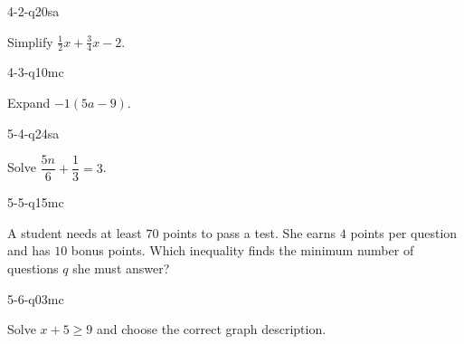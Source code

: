 \begin{practiceQuestion}{4-2-q20}{sa}
\begin{questionText}
Simplify $\frac{1}{2}x + \frac{3}{4}x - 2$.


\begin{center}
\hspace{1cm}
\end{center}
\end{questionText}
\end{practiceQuestion}

\begin{practiceQuestion}{4-3-q10}{mc}
\begin{questionText}
Expand $-1(5a - 9)$.
\end{questionText}
\end{practiceQuestion}

\begin{practiceQuestion}{5-4-q24}{sa}
\begin{questionText}
Solve $\dfrac{5n}{6} + \dfrac{1}{3} = 3$.
\end{questionText}
\end{practiceQuestion}

\begin{practiceQuestion}{5-5-q15}{mc}
\begin{questionText}
A student needs at least $70$ points to pass a test. She earns $4$ points per question and has $10$ bonus points. Which inequality finds the minimum number of questions $q$ she must answer?
\end{questionText}
\end{practiceQuestion}

\begin{practiceQuestion}{5-6-q03}{mc}
\begin{questionText}
Solve $x + 5 \geq 9$ and choose the correct graph description.
\end{questionText}
\end{practiceQuestion}

